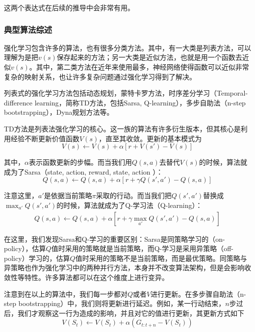 \documentclass[degree=bachelor, tocarialchapter, pifootnote]{thuthesis}
\begin{document}
    \par 这两个表达式在后续的推导中会非常有用。
    
    \subsubsection{典型算法综述}
      强化学习包含许多的算法，也有很多分类方法。其中，有一大类是列表方法，可以理解为是把$v(s)$保存起来的方法；另一大类是近似方法，也就是用一个函数去近似$v(s)$\cite{Sutton_book}。其中，第二类方法在近年来使用最多，神经网络使得函数可以近似非常复杂的映射关系，也让许多复杂问题通过强化学习得到了解决。\par
      列表式的强化学习方法包括动态规划\cite{Bellman_DP}，蒙特卡罗方法，时序差分学习（Temporal-difference learning，简称TD方法，包括Sarsa\cite{Sutton_book}, Q-learning\cite{Q_learning}）\cite{Sutton_problem_formulation}，多步自助法（n-step bootstrapping）\cite{n_step_bootstrapping}，Dyna规划方法\cite{Sutton_book}等。\par
      TD方法是列表法强化学习的核心。这一族的算法有许多衍生版本，但其核心是利用经验不断更新价值函数$V(s)$，直至其收敛。更新的基本模式为
      $$ V(s) \gets V(s) + \alpha [r + V(s') - V(s)] $$
      \par 其中，$\alpha$表示函数更新的步幅。而当我们用$Q(s, a)$去替代$V(s)$的时候，算法就成为了Sarsa（state, action, reward, state, action \cite{deepRL_overview}）：
      $$ Q(s, a) \gets Q(s, a) + \alpha [r + \gamma Q(s', a') - Q(s, a)] $$
      \par 注意这里，$a'$是依据当前策略$\pi$采取的行动。而当我们把$Q(s', a')$替换成$\max_{a'} Q(s', a')$的时候，算法就成为了Q-学习法（Q-learning）：
      \begin{align}
      \label{eq:Q_learning}
        Q(s, a) \gets Q(s, a) + \alpha [r + \gamma \max_{a'} Q(s', a') - Q(s, a)]
      \end{align}
      \par 在这里，我们发现Sarsa和Q-学习的重要区别：Sarsa是同策略学习的（on-policy），估算$Q$值时采用的策略就是当前策略，而Q-学习是采用异策略（off-policy）学习的，估算$Q$值时采用的策略不是当前策略，而是最优策略。同策略与异策略也作为强化学习中的两种并行方法，本身并不改变算法架构，但是会影响收敛性等特性。许多算法都可以在这个维度上进行变异。\par
      注意到在以上的算法中，我们每一步都对$Q$或者$V$进行更新。在多步骤自助法（n-step bootstrapping）中，我们则将更新进行延迟。例如，某一行动结束，$n$步过后，我们才观察这一行为造成的影响，并且对它的值进行更新，其更新方式如下
      $$ V(S_t) \gets V(S_t) + \alpha(G_{t:t+n} - V(S_t)) $$
\end{document}
